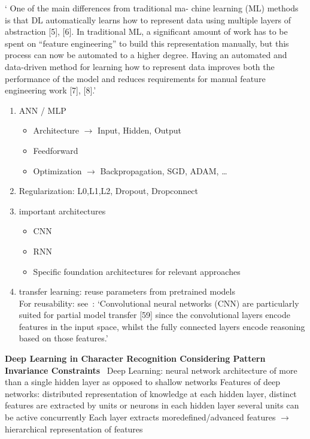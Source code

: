 ` One of the main differences from traditional ma- chine learning (ML) methods is that DL
automatically learns how to represent data using multiple layers of abstraction [5], [6].
In traditional ML, a significant amount of work has to be spent on “feature engineering” to
build this representation manually, but this process can now be automated to a higher degree.
Having an automated and data-driven method for learning how to represent data improves both the
performance of the model and reduces requirements for manual feature engineering work
[7], [8].'~\citep{arpteg_software_2018}

\begin{enumerate}
    \item ANN / MLP %
        \begin{itemize}
            \item Architecture $\rightarrow$ Input, Hidden, Output
            \item Feedforward
            \item Optimization $\rightarrow$ Backpropagation, SGD, ADAM, \ldots
        \end{itemize}
    \item Regularization: L0,L1,L2, Dropout, Dropconnect
    \item important architectures
        \begin{itemize}
            \item CNN %
            \item RNN %
            \item Specific foundation architectures for relevant approaches
        \end{itemize}
    \item transfer learning: reuse parameters from pretrained models\\


For reusability: see~\citep{ashmore_assuring_2021}: `Convolutional neural networks (CNN) are
particularly suited for partial model transfer [59] since the convolutional layers encode
features in the input space, whilst the fully connected layers encode reasoning based on those
features.'


\end{enumerate}

\textbf{Deep Learning in Character Recognition Considering Pattern Invariance
Constraints}~\citep{oyedotun_deep_2015}
Deep Learning: neural network architecture of more than a single hidden layer as opposed to shallow networks
Features of deep networks: distributed representation of knowledge at each hidden layer, distinct
features are extracted by units or neurons in each hidden layer
several units can be active concurrently
Each layer extracts moredefined/advanced features $\rightarrow$ hierarchical representation of
features

